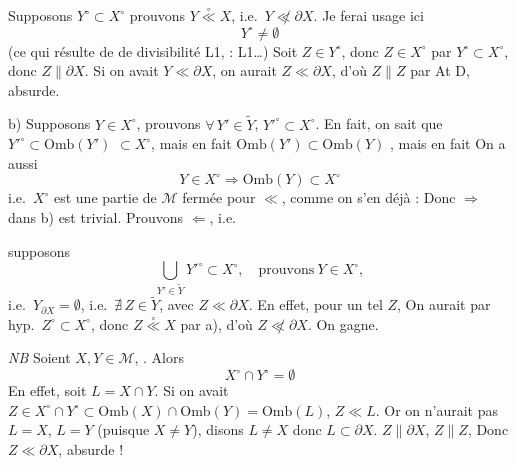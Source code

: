 \documentclass[11pt,a4paper]{article}
\begin{document}
Supposons $Y^{\circ} \subset X^{\circ}$ prouvons $Y \overset{\circ}{\ll} X$, i.e.\ $Y \not\ll \partial X$. Je ferai usage ici
\[
  \boxed{Y^{\circ} \neq \emptyset}
\]
(ce qui résulte de  de divisibilité L1, \ill{} \ill{} \ill{} \ill{} : L1\ldots) Soit $Z \in Y^{\circ}$, donc $Z \in X^{\circ}$ par $Y^{\circ} \subset X^{\circ}$, donc $Z \parallel \partial X$. Si on avait $Y \ll \partial X$, on aurait $Z \ll \partial X$, d'où $Z \parallel Z$ par At D, absurde.

b) Supposons $Y \in X^{\circ}$, prouvons $\forall\, Y' \in \widetilde{Y}$, $Y'^{\circ} \subset X^{\circ}$. En \struck{\ill{}} fait, on sait que $Y'^{\circ} \subset \mathrm{Omb}(Y')$ \ill{} $\subset X^{\circ}$, mais en fait $\mathrm{Omb}(Y') \subset \mathrm{Omb}(Y)$ \ill{}, mais en fait \struck{\ill{}} On a aussi
\[
  Y \in X^{\circ} \Longrightarrow \mathrm{Omb}(Y) \subset X^{\circ}
\]
i.e.\ $X^{\circ}$ est une partie de $\mathcal{M}$ \struck{\ill{}} fermée pour $\ll$, comme on s'en  déjà : Donc $\Longrightarrow$ dans b) est trivial. Prouvons $\Longleftarrow$, i.e.

supposons
\[
  \bigcup_{Y' \in \widetilde{Y}} Y'^{\circ} \subset X^{\circ} , \quad \text{prouvons}\ Y \in X^{\circ} ,
\]
i.e.\ $Y_{\partial X} = \emptyset$,  i.e.\ $\nexists\, Z \in \widetilde{Y}$, avec $Z \ll \partial X$. En effet, pour un tel $Z$,   On aurait par hyp.\ $Z^{\circ} \subset X^{\circ}$, donc $Z \overset{\circ}{\ll} X$ par a), d'où $Z \not\ll \partial X$. On gagne.

\emph{NB} Soient $X, Y \in \mathcal{M}$, . Alors
\[
  X^{\circ} \cap Y^{\circ} = \emptyset
\]
En effet, soit $L = X \cap Y$. Si on avait $Z \in X^{\circ} \cap Y^{\circ} \subset \mathrm{Omb}(X) \cap \mathrm{Omb}(Y) = \mathrm{Omb}(L)$, $Z \ll L$. Or on n'aurait  pas $L = X$, $L = Y$ (puisque $X \neq Y$), disons $L \neq X$ donc $L \subset \partial X$. \ill{} $Z \parallel \partial X$, $Z \parallel Z$, Donc $Z \ll \partial X$, \ill{} \ill{} absurde !
\end{document}
